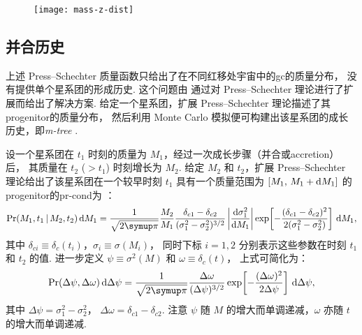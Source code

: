 \begin{figure}[htp]
  \centering
  \texttt{[image: mass-z-dist]}
  \label{fig:m-z-dist}
\end{figure}

\subsection{并合历史}
\label{sec:merging-history}

上述 Press--Schechter 质量函数只给出了在不同红移处宇宙中的\ac{gc}的质量分布，
没有提供单个星系团的形成历史.
这个问题由  通过对 Press--Schechter
理论进行了扩展而给出了解决方案.
给定一个星系团，扩展 Press--Schechter 理论描述了其\ac{progenitor}的质量分布，
然后利用 Monte Carlo 模拟便可构建出该星系团的成长历史，即\emph{\acf{m-tree}}
\cite{lacey1993,randall2002}.

设一个星系团在 $t_1$ 时刻的质量为 $M_1$，经过一次成长步骤（并合或\ac{accretion}）后，
其质量在 $t_2$ ($> t_1$) 时刻增长为 $M_2$.
给定 $M_2$ 和 $t_2$，扩展 Press--Schechter 理论给出了该星系团在一个较早时刻 $t_1$
具有一个质量范围为 $[M_1,\, M_1+\mathrm{d}M_1]$ 的\ac{progenitor}的\ac{pr-cond}为
\cite{lacey1993,randall2002}：
\begin{equation}
  \label{eq:eps-condprob}
  \R{Pr}(M_1, t_1 \,|\, M_2, t_2) \,\D{M_1} =
    \frac{1}{\sqrt{2\Cpi}} \frac{M_2}{M_1}
    \frac{\delta_{c1} - \delta_{c2}}{(\sigma_1^2 - \sigma_2^2)^{3/2}}
    \left| \diff{\sigma_1^2}{M_1} \right|
    \exp \!\left[ -\frac{(\delta_{c1} - \delta_{c2})^2}
      {2(\sigma_1^2 - \sigma_2^2)} \right] \,\D{M_1} ,
\end{equation}
其中
$\delta_{ci} \equiv \delta_c(t_i)$，$\sigma_i \equiv \sigma(M_i)$，
同时下标 $i = 1, 2$ 分别表示这些参数在时刻 $t_1$ 和 $t_2$ 的值.
进一步定义 $\psi \equiv \sigma^2(M)$ 和 $\omega \equiv \delta_c(t)$，
上式可简化为：
\begin{equation}
  \label{eq:eps-condprob2}
  \R{Pr}(\Delta\psi, \Delta\omega) \,\D{\Delta\psi} =
    \frac{1}{\sqrt{2\Cpi}} \frac{\Delta\omega}{(\Delta\psi)^{3/2}}
    \exp \!\left[ -\frac{(\Delta\omega)^2}{2 \Delta\psi} \right]
    \,\D{\Delta\psi} ,
\end{equation}
其中
$\Delta\psi = \sigma_1^2 - \sigma_2^2$，
$\Delta\omega = \delta_{c1} - \delta_{c2}$.
注意 $\psi$ 随 $M$ 的增大而单调递减，$\omega$ 亦随 $t$ 的增大而单调递减.

